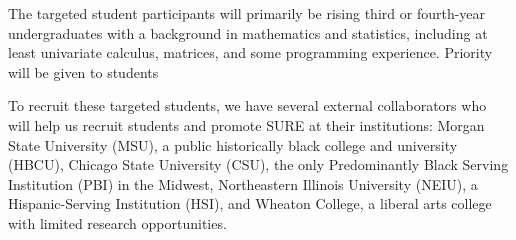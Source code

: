 \documentclass[11pt]{NSFamsart}
\newcommand{\MSIs}{\hyperlink{MSIlink}{MSIs}\xspace}
\begin{document}
The targeted student participants will primarily be rising third or fourth-year undergraduates with a  background
in mathematics and statistics, including at least univariate calculus, matrices, and some programming experience.
Priority will be given to students 
To recruit these targeted students,  we have several external collaborators who will help us recruit students and promote SURE at their institutions: Morgan State University (MSU), a public historically black college and university (HBCU), Chicago State University (CSU), the only  Predominantly Black Serving Institution (PBI) in the Midwest, Northeastern Illinois University (NEIU), a Hispanic-Serving Institution (HSI), and Wheaton College, a liberal arts college with limited research opportunities. 

\end{document}
